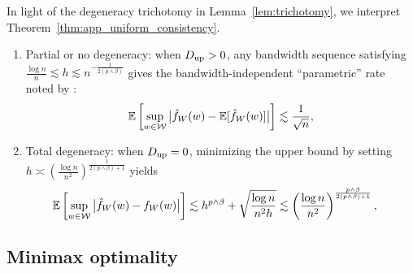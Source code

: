 \begin{remark}

  In light of the degeneracy trichotomy
  in Lemma~\ref{lem:trichotomy},
  we interpret Theorem~\ref{thm:app_uniform_consistency}.
  \begin{enumerate}[label=(\roman*)]

    \item Partial or no degeneracy:
      when $D_{\textup{up}} > 0$,
      any bandwidth sequence satisfying
      $\frac{\log n}{n} \lesssim h \lesssim n^{-\frac{1}{2(p \wedge \beta)}}$
      gives the bandwidth-independent ``parametric'' rate noted by
      \citet{graham2022kernel}:
      \begin{align*}
        \mathbb{E}\left[
          \sup_{w \in \mathcal{W}}
          \big|\hat f_W(w) - \mathbb{E}[\hat f_W(w)]\big|
        \right]
        \lesssim
        \frac{1}{\sqrt n},
      \end{align*}

    \item Total degeneracy:
      when $D_{\textup{up}} = 0$,
      minimizing the upper bound by setting
      $h \asymp
      \left( \frac{\log n}{n^2} \right)^{\frac{1}{2(p \wedge \beta)+1}}$
      yields
      \begin{align*}
        \mathbb{E}\left[
          \sup_{w \in \mathcal{W}}
          \big|\hat f_W(w) - f_W(w)\big|
        \right]
        &\lesssim
        h^{p \wedge \beta}
        + \sqrt{\frac{\log n}{n^2h}}
        \lesssim
        \left(
          \frac{\log n}{n^2}
        \right)^{\frac{p \wedge \beta}{2(p \wedge \beta)+1}},
      \end{align*}
  \end{enumerate}

\end{remark}

\subsection{Minimax optimality}


